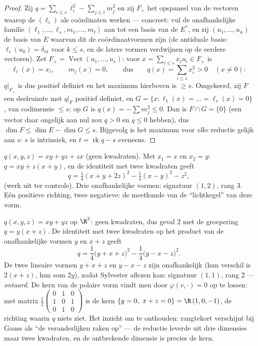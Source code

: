 \begin{proof}
Zij $q = \sum_{i \leq s}\ell_i^2 - \sum_{j\leq t} m_j^2$ en zij
$F_+$ het opspansel van de vectoren waarop de $(\ell_i)$ als
coördinaten werken --- concreet: vul de onafhankelijke familie
$(\ell_1, \dots, \ell_s, m_1, \dots, m_t)$ aan tot een basis van de
 $E^*$, en zij $(u_1, \dots, u_n)$ de basis van $E$
waarvan dit de coördinaatvormen zijn (de antiduale basis:
$\ell_i(u_k) = \delta_{ik}$ voor $k \leq s$, en de latere vormen
verdwijnen op de eerdere vectoren). Zet $F_+ =
\operatorname{Vect}(u_1, \dots, u_s)$: voor $x = \sum_{i\leq
s}x_iu_i \in F_+$ is
\[
\ell_i(x) = x_i,
\qquad m_j(x) = 0,
\qquad\text{dus}\qquad
q(x) = \sum_{i\leq s}x_i^2 > 0 \quad (x \neq 0) :
\]
$q|_{F_+}$ is dus positief definiet en het maximum hierboven is
$\geq s$. Omgekeerd, zij $F$ een deelruimte met $q|_F$ positief
definiet, en $G = \{x : \ell_1(x) = \dots = \ell_s(x) = 0\}$, van
codimensie $\leq s$; op $G$ is $q(x) = -\sum m_j^2 \leq 0$. Dan is
$F \cap G = \{0\}$ (een vector daar ongelijk aan nul zou $q > 0$ en
$q \leq 0$ hebben), dus $\dim F \leq \dim E - \dim G \leq s$.
Bijgevolg is het maximum voor \emph{elke} reductie gelijk aan $s$:
$s$ is intrinsiek, en $t = \operatorname{rk} q - s$ eveneens.
\end{proof}

\begin{example}\label{ex:b2:quadratic:gaussexample}
$q(x, y, z) = xy + yz + zx$ (geen kwadraten). Met $x_1 = x$ en $x_2
= y$: $q = xy + z(x + y)$, en de identiteit met twee kwadraten
geeft
\[
q = \tfrac14(x + y + 2z)^2 - \tfrac14(x - y)^2 - z^2 ,
\]
(werk uit ter controle). Drie onafhankelijke vormen: signatuur $(1,
2)$, rang $3$. Eén positieve richting, twee negatieve: de
meetkunde van de ``lichtkegel'' van deze vorm.
\end{example}

\begin{example}\label{ex:b2:quadratic:degenerate}
$q(x, y, z) = xy + yz$ op $\R^3$: geen kwadraten, dus geval 2 met
de groepering $q = y(x + z)$. De identiteit met twee kwadraten op
het product van de onafhankelijke vormen $y$ en $x + z$ geeft
\[
q = \frac14\bigl(y + x + z\bigr)^2 -
\frac14\bigl(y - x - z\bigr)^2 .
\]
De twee lineaire vormen $y + x + z$ en $y - x - z$ zijn
onafhankelijk (hun verschil is $2(x+z)$, hun som $2y$), zodat
Sylvester aflezen kan: signatuur $(1, 1)$, rang $2$ ---
\emph{ontaard}. De kern van de polaire vorm vindt men door
$\varphi(v, \cdot) = 0$ op te lossen: met matrix
$\frac12\begin{pmatrix} 0&1&0\\ 1&0&1\\ 0&1&0\end{pmatrix}$ is de
kern $\{y = 0,\ x + z = 0\} = \R\,(1, 0, -1)$, de richting waarin
$q$ niets ziet. Het inzicht om te onthouden: rangtekort verschijnt
bij Gauss als ``de veranderlijken raken op'' --- de reductie
leverde uit drie dimensies maar twee kwadraten, en de ontbrekende
dimensie is precies de kern.
\end{example}

